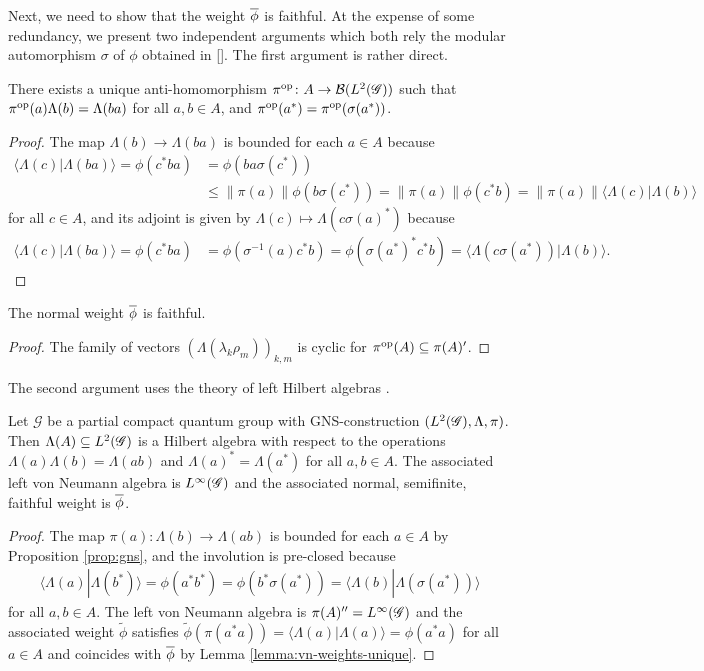 Next, we need to show that the weight $\overline{\phi}$ is faithful. At the
expense of some redundancy, we present two independent arguments which
both rely the modular automorphism $\sigma$ of $\phi$ obtained in
\ref{}. The first argument is rather direct.
\begin{Lem}
  There exists a unique anti-homomorphism $\pi^{\operatorname{\mathrm{op}}} \colon A \to
  \mathcal{B}(L^{2}(\mathscr{G}))$ such that $\pi^{\operatorname{\mathrm{op}}}(a)\Lambda(b) =
  \Lambda(ba)$ for all $a,b\in A$, and $\pi^{\operatorname{\mathrm{op}}}(a^{*})  = \pi^{\operatorname{\mathrm{op}}}(\sigma(a^{*}))$.
\end{Lem}
\begin{proof}
The map $\Lambda(b) \to \Lambda(ba)$ is bounded for each $a\in A$ because
  \begin{align*}
    \langle \Lambda(c)|\Lambda(ba)\rangle
    =\phi(c^{*}ba)&=\phi(ba\sigma(c^{*})) \\ &\leq \|\pi(a)\|
    \phi(b\sigma(c^{*})) = \|\pi(a)\| \phi(c^{*}b) =\|\pi(a)\| \langle \Lambda(c)|\Lambda(b)\rangle
  \end{align*}
  for all $c \in A$, and its adjoint is given by $\Lambda(c)\mapsto
  \Lambda(c\sigma(a)^{*})$ because
  \begin{align*}
        \langle \Lambda(c)|\Lambda(ba)\rangle
    =\phi(c^{*}ba)&= \phi(\sigma^{-1}(a)c^{*}b)
    =\phi(\sigma(a^{*})^{*}c^{*}b) =
    \langle\Lambda(c\sigma(a^{*}))|\Lambda(b)\rangle. 
  \end{align*}
\end{proof}
\begin{Lem}
  The normal weight $\overline{\phi}$ is faithful.
\end{Lem}
\begin{proof}
  The family of vectors $(\Lambda(\lambda_{k}\rho_{m}))_{k,m}$ is
  cyclic for $\pi^{\operatorname{\mathrm{op}}}(A) \subseteq \pi(A)'$.
\end{proof}
The second argument uses the theory of left Hilbert algebras \cite{}.
\begin{Prop} \label{prop:hilbert-algebra} 
Let $\mathscr{G}$ be a partial compact quantum group with
GNS-construction $(L^{2}(\mathscr{G}),\Lambda,\pi)$. Then $\Lambda(A) \subseteq
L^{2}(\mathscr{G})$ is a Hilbert algebra with respect to the operations
  $\Lambda(a)\Lambda(b)=\Lambda(ab)$ and
  $\Lambda(a)^{*}= \Lambda(a^{*})$ for all $a,b\in A$. The associated
  left von Neumann algebra  is $L^{\infty}(\mathscr{G})$ and the associated normal,
  semifinite, faithful weight is $\overline{\phi}$.
\end{Prop}
\begin{proof}
  The map $\pi(a)\colon \Lambda(b) \to \Lambda(ab)$ is bounded for
  each $a \in A$ by Proposition \ref{prop:gns}, and the involution is
  pre-closed because
  \begin{align*}
    \langle \Lambda(a)|\Lambda(b^{*})\rangle = \phi(a^{*}b^{*}) =
    \phi(b^{*}\sigma(a^{*})) = \langle
    \Lambda(b)|\Lambda(\sigma(a^{*}))\rangle
  \end{align*}
  for all $a,b \in A$. The left von Neumann algebra is
  $\pi(A)''=L^{\infty}(\mathscr{G})$ and the associated weight $\tilde\phi$ satisfies
  $\tilde \phi(\pi(a^{*}a))=\langle\Lambda(a)|\Lambda(a)\rangle =
  \phi(a^{*}a)$ for all $a\in A$ and coincides with $\overline{\phi}$ by Lemma
  \ref{lemma:vn-weights-unique}.
\end{proof}
